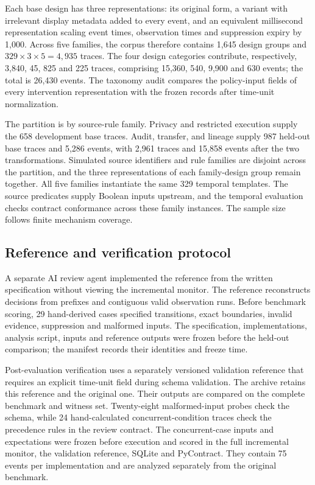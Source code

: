 \documentclass[preprint,11pt]{elsarticle}
\begin{document}
Each base design has three representations: its original form, a variant with irrelevant display metadata added to every event, and an equivalent millisecond representation scaling event times, observation times and suppression expiry by 1,000. Across five families, the corpus therefore contains 1,645 design groups and $329\times3\times5=4,935$ traces. The four design categories contribute, respectively, 3,840, 45, 825 and 225 traces, comprising 15,360, 540, 9,900 and 630 events; the total is 26,430 events. The taxonomy audit compares the policy-input fields of every intervention representation with the frozen records after time-unit normalization.


The partition is by source-rule family. Privacy and restricted execution supply the 658 development base traces. Audit, transfer, and lineage supply 987 held-out base traces and 5,286 events, with 2,961 traces and 15,858 events after the two transformations. Simulated source identifiers and rule families are disjoint across the partition, and the three representations of each family-design group remain together. All five families instantiate the same 329 temporal templates. The source predicates supply Boolean inputs upstream, and the temporal evaluation checks contract conformance across these family instances. The sample size follows finite mechanism coverage.

\subsection{Reference and verification protocol}
A separate AI review agent implemented the reference from the written specification without viewing the incremental monitor. The reference reconstructs decisions from prefixes and contiguous valid observation runs. Before benchmark scoring, 29 hand-derived cases specified transitions, exact boundaries, invalid evidence, suppression and malformed inputs. The specification, implementations, analysis script, inputs and reference outputs were frozen before the held-out comparison; the manifest records their identities and freeze time.

Post-evaluation verification uses a separately versioned validation reference that requires an explicit time-unit field during schema validation. The archive retains this reference and the original one. Their outputs are compared on the complete benchmark and witness set. Twenty-eight malformed-input probes check the schema, while 24 hand-calculated concurrent-condition traces check the precedence rules in the review contract. The concurrent-case inputs and expectations were frozen before execution and scored in the full incremental monitor, the validation reference, SQLite and PyContract. They contain 75 events per implementation and are analyzed separately from the original benchmark.
\end{document}
